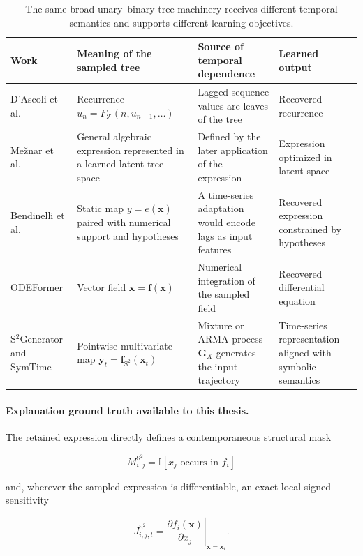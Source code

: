\begin{table}[H]
\centering
\footnotesize
\renewcommand{\arraystretch}{1.06}
\begin{tabular}{@{}p{}p{}p{}p{}@{}}
\toprule
Work & Meaning of the sampled tree & Source of temporal dependence & Learned output \tabularnewline
\midrule
D'Ascoli et al. & Recurrence $u_n=F_{\mathcal T}(n,u_{n-1},\ldots)$ & Lagged sequence values are leaves of the tree & Recovered recurrence \tabularnewline
Me\v{z}nar et al. & General algebraic expression represented in a learned latent tree space & Defined by the later application of the expression & Expression optimized in latent space \tabularnewline
Bendinelli et al. & Static map $y=e(\mathbf x)$ paired with numerical support and hypotheses & A time-series adaptation would encode lags as input features & Recovered expression constrained by hypotheses \tabularnewline
ODEFormer & Vector field $\dot{\mathbf x}=\mathbf f(\mathbf x)$ & Numerical integration of the sampled field & Recovered differential equation \tabularnewline
S$^2$Generator and SymTime & Pointwise multivariate map $\mathbf y_t=\mathbf f_{\mathrm{S^2}}(\mathbf x_t)$ & Mixture or ARMA process $\mathbf G_X$ generates the input trajectory & Time-series representation aligned with symbolic semantics \tabularnewline
\bottomrule
\end{tabular}
\caption{The same broad unary--binary tree machinery receives different
temporal semantics and supports different learning objectives.}
\label{tab:s2-vs-symbolic-regression}
\end{table}

\paragraph{Explanation ground truth available to this thesis.}
The retained expression directly defines a contemporaneous structural mask

\begin{equation}
M^{\mathrm{S^2}}_{i,j}
=\mathbb I[x_j\text{ occurs in }f_i]
\label{eq:s2-structural-mask}
\end{equation}

and, wherever the sampled expression is differentiable, an exact local signed
sensitivity

\begin{equation}
J^{\mathrm{S^2}}_{i,j,t}
=\left.
\frac{\partial f_i(\mathbf x)}{\partial x_j}
\right|_{\mathbf x=\mathbf x_t}.
\label{eq:s2-local-jacobian}
\end{equation}

